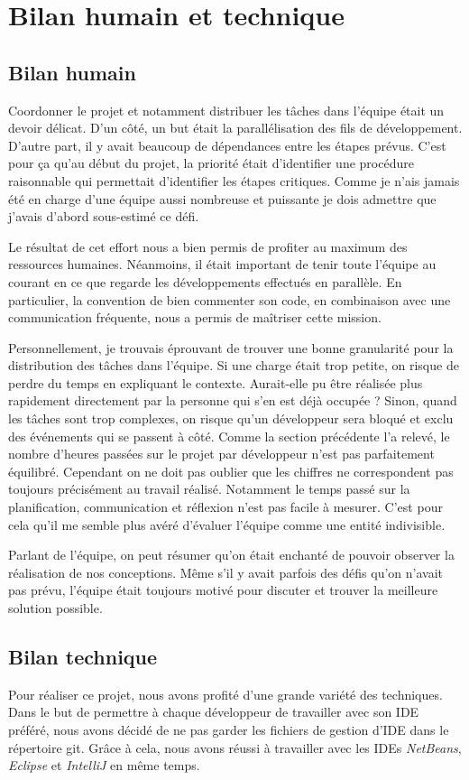 \documentclass[10pt,a4paper]{book}
\begin{document}
\section{Bilan humain et technique}
\subsection{Bilan humain}
Coordonner le projet et notamment distribuer les tâches dans l'équipe était un devoir délicat. D'un côté, un but était la parallélisation des fils de développement. D'autre part, il y avait beaucoup de dépendances entre les étapes prévus. C'est pour ça qu'au début du projet, la priorité était d'identifier une procédure raisonnable qui permettait d'identifier les étapes critiques. Comme je n'ais jamais été en charge d'une équipe aussi nombreuse et puissante je dois admettre que j'avais d'abord sous-estimé ce défi.

Le résultat de cet effort nous a bien permis de profiter au maximum des ressources humaines. Néanmoins, il était important de tenir toute l'équipe au courant en ce que regarde les développements effectués en parallèle. En particulier, la convention de bien commenter son code, en combinaison avec une communication fréquente, nous a permis de maîtriser cette mission.

Personnellement, je trouvais éprouvant de trouver une bonne granularité pour la distribution des tâches dans l'équipe. Si une charge était trop petite, on risque de perdre du temps en expliquant le contexte. Aurait-elle pu être réalisée plus rapidement directement par la personne qui s'en est déjà occupée ? Sinon, quand les tâches sont trop complexes, on risque qu'un développeur sera bloqué et exclu des événements qui se passent à côté. Comme la section précédente l'a relevé, le nombre d'heures passées sur le projet par développeur n'est pas parfaitement équilibré. Cependant on ne doit pas oublier que les chiffres ne correspondent pas toujours précisément au travail réalisé. Notamment le temps passé sur la planification, communication et réflexion n'est pas facile à mesurer. C'est pour cela qu'il me semble plus avéré d'évaluer l'équipe comme une entité indivisible.

Parlant de l'équipe, on peut résumer qu'on était enchanté de pouvoir observer la réalisation de nos conceptions. Même s'il y avait parfois des défis qu'on n'avait pas prévu, l'équipe était toujours motivé pour discuter et trouver la meilleure solution possible.
\subsection{Bilan technique}
Pour réaliser ce projet, nous avons profité d'une grande variété des techniques. Dans le but de permettre à chaque développeur de travailler avec son IDE préféré, nous avons décidé de ne pas garder les fichiers de gestion d'IDE dans le répertoire git. Grâce à cela, nous avons réussi à travailler avec les IDEs \textit{NetBeans}, \textit{Eclipse} et \textit{IntelliJ} en même temps. 
\end{document}
